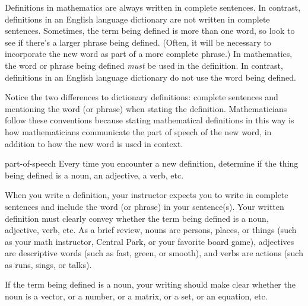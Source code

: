 \documentclass{book}
\theoremstyle{ekimcustom}
\begin{document}
Definitions in mathematics are always written in complete sentences. In contrast, definitions in an English language dictionary are not written in complete sentences. Sometimes, the term being defined is more than one word, so look to see if there's a larger phrase being defined. (Often, it will be necessary to incorporate the new word as part of a more complete phrase.) In mathematics, the word or phrase being defined \emph{must} be used in the definition. In contrast, definitions in an English language dictionary do not use the word being defined.

Notice the two differences to dictionary definitions: complete sentences and mentioning the word (or phrase) when stating the definition.
Mathematicians follow these conventions because stating mathematical definitions in this way is how mathematicians communicate the part of speech of the new word, in addition to how the new word is used in context.
\begin{bhabit}{}{part-of-speech}
Every time you encounter a new definition, determine if the thing being defined is a noun, an adjective, a verb, etc.
\end{bhabit}
When you write a definition, your instructor expects you to write in complete sentences and include the word (or phrase) in your sentence(s). Your written definition must clearly convey whether the term being defined is a noun, adjective, verb, etc. As a brief review, nouns are persons, places, or things (such as your math instructor, Central Park, or your favorite board game), adjectives are descriptive words (such as fast, green, or smooth), and verbs are actions (such as runs, sings, or talks).

If the term being defined is a noun, your writing should make clear whether the noun is a vector, or a number, or a matrix, or a set, or an equation, etc.
\end{document}
